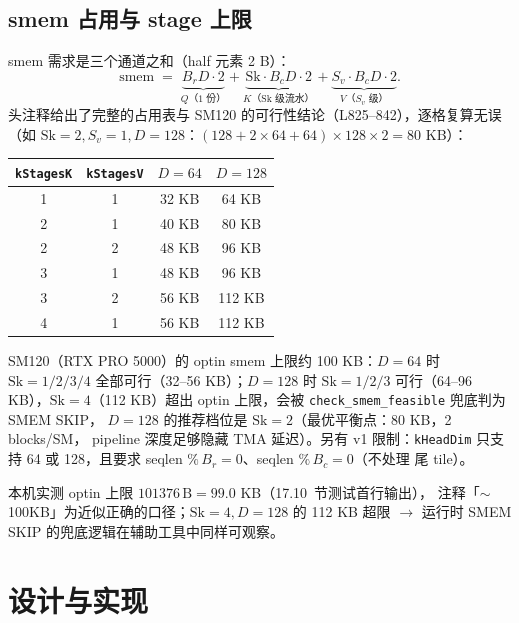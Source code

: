 \subsection{smem 占用与 stage 上限}

smem 需求是三个通道之和（half 元素 2 B）：
\begin{equation}
  \mathrm{smem} \;=\; \underbrace{B_r D \cdot 2}_{Q\text{（1 份）}}
  + \underbrace{\mathrm{Sk} \cdot B_c D \cdot 2}_{K\text{（Sk 级流水）}}
  + \underbrace{S_v \cdot B_c D \cdot 2}_{V\text{（}S_v\text{ 级）}} .
  \label{eq:17-qbytes}
\end{equation}
头注释给出了完整的占用表与 SM120 的可行性结论（L825--842），逐格复算无误
（如 $\mathrm{Sk}{=}2, S_v{=}1, D{=}128$：$(128 + 2 \times 64 + 64) \times 128
\times 2 = 80$ KB）：

\begin{center}
\begin{tabular}{cccc}
\toprule
\texttt{kStagesK} & \texttt{kStagesV} & $D{=}64$ & $D{=}128$ \\
\midrule
1 & 1 & 32 KB & 64 KB \\
2 & 1 & 40 KB & 80 KB \\
2 & 2 & 48 KB & 96 KB \\
3 & 1 & 48 KB & 96 KB \\
3 & 2 & 56 KB & 112 KB \\
4 & 1 & 56 KB & 112 KB \\
\bottomrule
\end{tabular}
\end{center}

SM120（RTX PRO 5000）的 optin smem 上限约 100 KB：$D{=}64$ 时
$\mathrm{Sk} = 1/2/3/4$ 全部可行（32--56 KB）；$D{=}128$ 时
$\mathrm{Sk} = 1/2/3$ 可行（64--96 KB），$\mathrm{Sk}{=}4$（112 KB）超出
optin 上限，会被 \texttt{check\_smem\_feasible} 兜底判为 SMEM SKIP，
$D{=}128$ 的推荐档位是 $\mathrm{Sk}{=}2$（最优平衡点：80 KB，2 blocks/SM，
pipeline 深度足够隐藏 TMA 延迟）。另有 v1 限制：\texttt{kHeadDim} 只支持
64 或 128，且要求 seqlen $\%\, B_r = 0$、seqlen $\%\, B_c = 0$（不处理
尾 tile）。

本机实测 optin 上限 $101376\,\mathrm{B} = 99.0$ KB（17.10~节测试首行输出），
注释「$\sim$100KB」为近似正确的口径；$\mathrm{Sk}{=}4, D{=}128$ 的 112 KB
超限 $\to$ 运行时 SMEM SKIP 的兜底逻辑在辅助工具中同样可观察。

\section{设计与实现}

